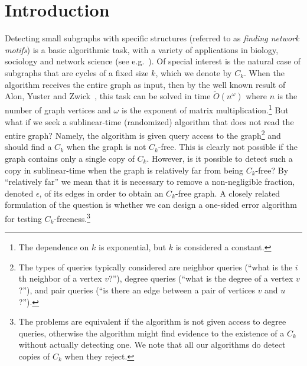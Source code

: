 \documentclass{article}
\newcommand{\eps}{\epsilon}
\newcommand{\commentt}[1]{ {}}
\newcommand{\reut}[1]{ {}}
\begin{document}

\section{Introduction}\label{sec:intro}
Detecting small subgraphs with  specific structures  (referred to as \emph{finding network motifs}) is a basic algorithmic task, with a variety of applications in biology, sociology and network science (see e.g.~\cite{HoLe70, Co88, portes2000social, EcMo02, burt2004structural, milo2002network, alon2007network, foucault2010friend, BerryHLP11, SeKoPi11, JRT12}). 
Of special  interest is the natural %
case of subgraphs that are cycles of a fixed size $k$, which we denote by $C_k$.
When the algorithm receives the entire graph as input, then by the well known %
result of Alon, Yuster and Zwick~\cite{AYZ}, this task can be solved in  time $\widetilde{O}(n^{\omega})$ 
where $n$ is the number of graph vertices and $\omega$ is the exponent of matrix multiplication.\footnote{The dependence on $k$ is exponential, but $k$ is considered a constant.}
But what if we seek a sublinear-time (randomized) algorithm that does not read the entire graph? Namely, the algorithm is given  query access to the graph\footnote{\label{foot:queries} The  types of queries typically considered are neighbor queries (``what is the $i$th neighbor of a vertex $v$?''), degree queries (``what is the degree of a vertex $v$?''), and pair queries (``is there an edge between a pair of vertices $v$ and $u$?'').} %
and should find a $C_k$ when the graph is not $C_k$-free.
This is clearly not possible if the graph contains only a single copy of $C_k$. 
However, is it possible to detect such a copy in sublinear-time when the graph is relatively far from being $C_k$-free?
By ``relatively far'' we mean that it is necessary to remove a non-negligible fraction, denoted $\eps$, of its edges in order to obtain an $C_k$-free graph. %
A closely related formulation of the question is whether we can design a one-sided error algorithm for testing $C_k$-freeness.\footnote{The problems are equivalent if the algorithm is not given access to degree queries, otherwise the algorithm might find evidence to the existence of a $C_k$ without actually detecting one. We note that all our algorithms do detect copies of $C_k$ when they reject.}
\end{document}
